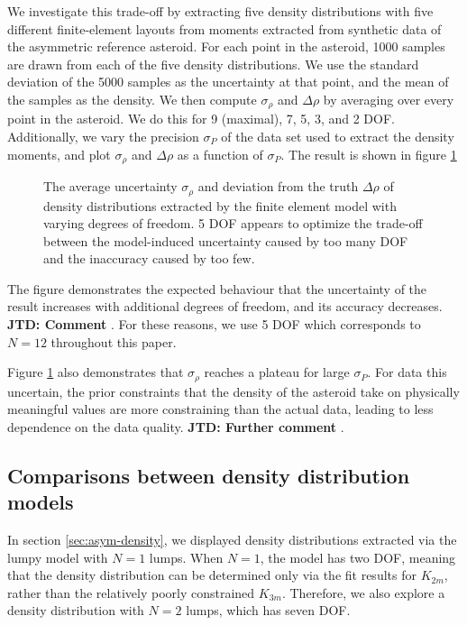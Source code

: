 \documentclass[fleqn,usenatbib]{mnras}
\newcommand{\jtd}[1]{ {\bf{\color{red} JTD: #1}} }
\begin{document}
We investigate this trade-off by extracting five density distributions with five different finite-element layouts from moments extracted from synthetic data of the asymmetric reference asteroid. For each point in the asteroid, 1000 samples are drawn from each of the five density distributions. We use the standard deviation of the 5000 samples as the uncertainty at that point, and the mean of the samples as the density. We then compute $\sigma_\rho$ and $\Delta \rho$ by averaging over every point in the asteroid. We do this for 9 (maximal), 7, 5, 3, and 2 DOF. Additionally, we vary the precision $\sigma_P$ of the data set used to extract the density moments, and plot $\sigma_\rho$ and $\Delta \rho$ as a function of $\sigma_P$. The result is shown in figure \ref{fig:dof-scan}

\begin{figure}
  \caption{The average uncertainty $\sigma_\rho$ and deviation from the truth $\Delta \rho$ of density distributions extracted by the finite element model with varying degrees of freedom. 5 DOF appears to optimize the trade-off between the model-induced uncertainty caused by too many DOF and the inaccuracy caused by too few.}
  \label{fig:dof-scan}
\end{figure}

The figure demonstrates the expected behaviour that the uncertainty of the result increases with additional degrees of freedom, and its accuracy decreases. \jtd{Comment}. For these reasons, we use 5 DOF which corresponds to $N=12$ throughout this paper.

Figure \ref{fig:dof-scan} also demonstrates that $\sigma_\rho$ reaches a plateau for large $\sigma_P$. For data this uncertain, the prior constraints that the density of the asteroid take on physically meaningful values are more constraining than the actual data, leading to less dependence on the data quality. \jtd{Further comment}.


\subsection{Comparisons between density distribution models}
\label{sec:density-compare}

In section \ref{sec:asym-density}, we displayed density distributions extracted via the lumpy model with $N=1$ lumps. When $N=1$, the model has two DOF, meaning that the density distribution can be determined only via the fit results for $K_{2m}$, rather than the relatively poorly constrained $K_{3m}$. Therefore, we also explore a density distribution with $N=2$ lumps, which has seven DOF.
\end{document}
